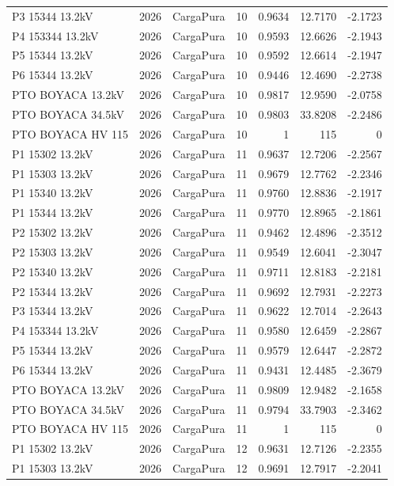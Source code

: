 \documentclass[11pt,a4paper]{article}
\begin{document}
\begin{longtable}{llllrrr}
P3 15344 13.2kV & 2026 & CargaPura & 10 & 0.9634 & 12.7170 & -2.1723 \\
P4 153344 13.2kV & 2026 & CargaPura & 10 & 0.9593 & 12.6626 & -2.1943 \\
P5 15344 13.2kV & 2026 & CargaPura & 10 & 0.9592 & 12.6614 & -2.1947 \\
P6 15344 13.2kV & 2026 & CargaPura & 10 & 0.9446 & 12.4690 & -2.2738 \\
PTO BOYACA 13.2kV & 2026 & CargaPura & 10 & 0.9817 & 12.9590 & -2.0758 \\
PTO BOYACA 34.5kV & 2026 & CargaPura & 10 & 0.9803 & 33.8208 & -2.2486 \\
PTO BOYACA HV 115 & 2026 & CargaPura & 10 & 1 & 115 & 0 \\
P1 15302 13.2kV & 2026 & CargaPura & 11 & 0.9637 & 12.7206 & -2.2567 \\
P1 15303 13.2kV & 2026 & CargaPura & 11 & 0.9679 & 12.7762 & -2.2346 \\
P1 15340 13.2kV & 2026 & CargaPura & 11 & 0.9760 & 12.8836 & -2.1917 \\
P1 15344 13.2kV & 2026 & CargaPura & 11 & 0.9770 & 12.8965 & -2.1861 \\
P2 15302 13.2kV & 2026 & CargaPura & 11 & 0.9462 & 12.4896 & -2.3512 \\
P2 15303 13.2kV & 2026 & CargaPura & 11 & 0.9549 & 12.6041 & -2.3047 \\
P2 15340 13.2kV & 2026 & CargaPura & 11 & 0.9711 & 12.8183 & -2.2181 \\
P2 15344 13.2kV & 2026 & CargaPura & 11 & 0.9692 & 12.7931 & -2.2273 \\
P3 15344 13.2kV & 2026 & CargaPura & 11 & 0.9622 & 12.7014 & -2.2643 \\
P4 153344 13.2kV & 2026 & CargaPura & 11 & 0.9580 & 12.6459 & -2.2867 \\
P5 15344 13.2kV & 2026 & CargaPura & 11 & 0.9579 & 12.6447 & -2.2872 \\
P6 15344 13.2kV & 2026 & CargaPura & 11 & 0.9431 & 12.4485 & -2.3679 \\
PTO BOYACA 13.2kV & 2026 & CargaPura & 11 & 0.9809 & 12.9482 & -2.1658 \\
PTO BOYACA 34.5kV & 2026 & CargaPura & 11 & 0.9794 & 33.7903 & -2.3462 \\
PTO BOYACA HV 115 & 2026 & CargaPura & 11 & 1 & 115 & 0 \\
P1 15302 13.2kV & 2026 & CargaPura & 12 & 0.9631 & 12.7126 & -2.2355 \\
P1 15303 13.2kV & 2026 & CargaPura & 12 & 0.9691 & 12.7917 & -2.2041 \\

\end{longtable}
\end{document}
